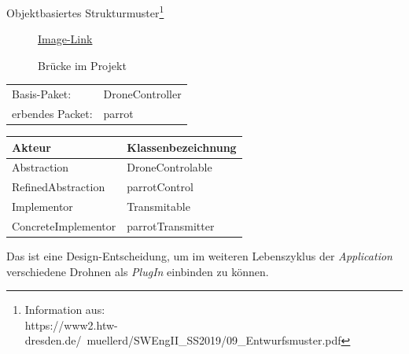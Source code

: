 
Objektbasiertes Strukturmuster\footnote{Information aus:\\https://www2.htw-dresden.de/~muellerd/SWEngII\_SS2019/09\_Entwurfsmuster.pdf}


\begin{figure}[ht!]
\vspace{0.25cm}
\begin{center}
\caption{Brücke im Projekt}
\label{fig:Bridge}
\end{center}

\vspace{0.25cm}
\href{https://github.com/MaagMich/SWE2\_Project/blob/c5c3674bd201ee306463881cf711bb2ce9229842/Ausarbeitung/Pictures/Bridge.png}{Image-Link}
\end{figure}


\begin{tabular}{ll}
Basis-Paket:		& DroneController\\
erbendes Packet:	& parrot
\end{tabular}
\begin{table}[!ht]
\begin{tabular}{ll}
Akteur			& Klassenbezeichnung \\ \hline
Abstraction		& DroneControlable\\
RefinedAbstraction	& parrotControl\\
Implementor		& Transmitable\\
ConcreteImplementor	& parrotTransmitter\\
\end{tabular}
\end{table}


Das ist eine Design-Entscheidung, um im weiteren Lebenszyklus der \textit{Application} verschiedene Drohnen als \textit{PlugIn} einbinden zu können.












